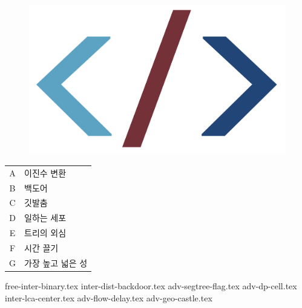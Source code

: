 \documentclass[11pt,a4paper,oneside,korean]{article}
\begin{document}
    
    \begin{titlepage}
        
    \end{titlepage}
    \begin{figure}[h]
        \centering
        \includegraphics[height=0.12\textheight]{./logo-cropped.png}
    \end{figure}
    \skhintro
    {
    
    \begin{table}[h]
    \sffamily\Large
    \renewcommand{\arraystretch}{1.2}
        \begin{tabular}{cl}
        A & 이진수 변환 \\
        B & 백도어 \\
        C & 깃발춤 \\
        D & 일하는 세포 \\
        E & 트리의 외심 \\
        F & 시간 끌기 \\
        G & 가장 높고 넓은 성 \\
        \end{tabular}
    \end{table}
    }

    \skhintroctd
    
    \newpage
    
    {free-inter-binary.tex}       %
    {inter-dist-backdoor.tex}     %
    {adv-segtree-flag.tex}        %
    {adv-dp-cell.tex}             %
    {inter-lca-center.tex}        %
    {adv-flow-delay.tex}          %
    {adv-geo-castle.tex}          %
\end{document}
